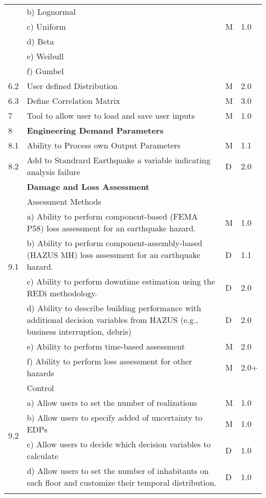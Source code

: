 {\begin{longtable}{| p{} | p{} | p{} | p{} |}
	 & b)     Lognormal &  &  \\ 
	 & c)     Uniform & M  & 1.0 \\ 
	 & d)     Beta &  &  \\ 
	 & e)     Weibull &  &  \\ 
	 & f)     Gumbel &  &  \\ \hline
	6.2 & User defined Distribution & M & 2.0 \\ \hline
	6.3 & Define Correlation Matrix & M & 3.0 \\ \hline
	7 & Tool to allow user to load and save user inputs & M & 1.0 \\ \hline
	8 & \textbf{Engineering Demand Parameters} &  &  \\ \hline
	8.1 & Ability to Process own Output Parameters & M & 1.1  \\ \hline
	8.2 & Add to Standrard Earthquake a variable indicating analysis failure & D & 2.0  \\ \hline
\softwareSwitch{PBE}{9 & \textbf{Damage and Loss Assessment} & & \\ \hline
    \multirow{5}{*}{9.1} & Assessment Methods & & \\
     & a) Ability to perform component-based (FEMA P58) loss assessment for an earthquake hazard. & M & 1.0 \\
     & b) Ability to perform component-assembly-based (HAZUS MH) loss assessment for an earthquake hazard. & D & 1.1 \\
     & c) Ability to perform downtime estimation using the REDi methodology. & D & 2.0 \\
     & d) Ability to describe building performance with additional decision variables from HAZUS (e.g., business interruption, debris) & D & 2.0 \\
     & e) Ability to perform time-based assessment & M & 2.0 \\
     & f) Ability to perform loss assessment for other hazards & M & 2.0+ \\ \hline
    \multirow{5}{*}{9.2} & Control & & \\
     & a) Allow users to set the number of realizations & M & 1.0\\
     & b) Allow users to specify added of uncertainty to EDPs & M & 1.0 \\
     & c) Allow users to decide which decision variables to calculate & D & 1.0 \\
     & d) Allow users to set the number of inhabitants on each floor and customize their temporal distribution. & D & 1.0 \\
}
\end{longtable}}
